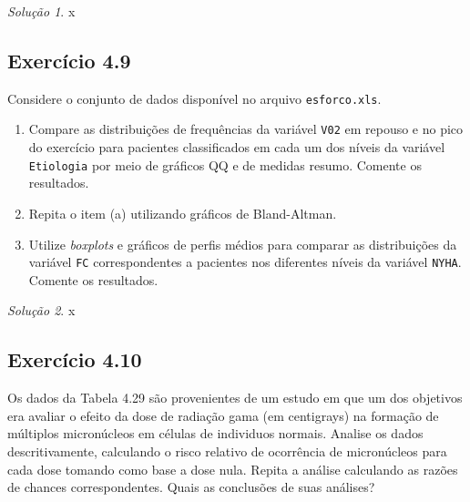 \documentclass[
]{latex/krantz}
\providecommand{\tightlist}{%
  \setlength{\itemsep}{0pt}\setlength{\parskip}{0pt}}
\theoremstyle{definition}
\theoremstyle{definition}
\theoremstyle{definition}
\theoremstyle{definition}
\theoremstyle{remark}
\newtheorem*{solution}{Solução}
\begin{document}
\begin{solution}
x
\end{solution}

\hypertarget{exr4-9}{%
\subsection*{Exercício 4.9}\label{exr4-9}}

Considere o conjunto de dados disponível no arquivo \texttt{esforco.xls}.

\begin{enumerate}
\def\labelenumi{\alph{enumi}.}
\tightlist
\item
  Compare as distribuições de frequências da variável \texttt{V02} em repouso e no pico do exercício para pacientes classificados em cada um dos níveis da variável \texttt{Etiologia} por meio de gráficos QQ e de medidas resumo. Comente os resultados.
\item
  Repita o item (a) utilizando gráficos de Bland-Altman.
\item
  Utilize \emph{boxplots} e gráficos de perfis médios para comparar as distribuições da variável \texttt{FC} correspondentes a pacientes nos diferentes níveis da variável \texttt{NYHA}. Comente os resultados.
\end{enumerate}

\begin{solution}
x
\end{solution}

\hypertarget{exr4-10}{%
\subsection*{Exercício 4.10}\label{exr4-10}}

Os dados da Tabela 4.29 são provenientes de um estudo em que um dos objetivos era avaliar o efeito da dose de radiação gama (em centigrays) na formação de múltiplos micronúcleos em células de individuos normais. Analise os dados descritivamente, calculando o risco relativo de ocorrência de micronúcleos para cada dose tomando como base a dose nula. Repita a análise calculando as razões de chances correspondentes. Quais as conclusões de suas análises?
\end{document}

